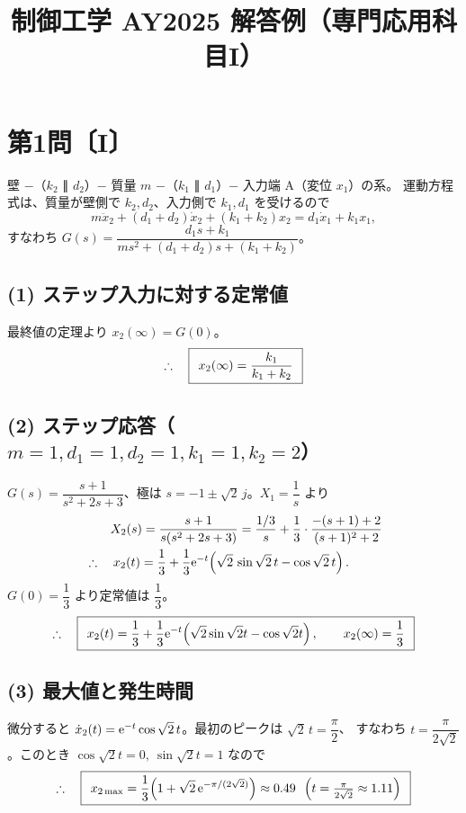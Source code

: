 \documentclass[11pt,a4paper]{article}
\title{制御工学 AY2025 解答例（専門応用科目I）}
\author{}
\date{}
\begin{document}
\maketitle

\section*{第1問〔I〕}

壁 $-$（$k_2$ ∥ $d_2$）$-$ 質量 $m$ $-$（$k_1$ ∥ $d_1$）$-$ 入力端 A（変位 $x_1$）の系。
運動方程式は、質量が壁側で $k_2,d_2$、入力側で $k_1,d_1$ を受けるので
\[
  m\ddot{x}_2+(d_1+d_2)\dot{x}_2+(k_1+k_2)x_2=d_1\dot{x}_1+k_1 x_1,
\]
すなわち $G(s)=\dfrac{d_1 s+k_1}{ms^2+(d_1+d_2)s+(k_1+k_2)}$。

\subsection*{(1) ステップ入力に対する定常値}
最終値の定理より $x_2(\infty)=G(0)$。
\[
  \therefore\quad \boxed{\,\;x_2(\infty)=\dfrac{k_1}{k_1+k_2}\;\,}
\]

\subsection*{(2) ステップ応答（$m=1,d_1=1,d_2=1,k_1=1,k_2=2$）}
$G(s)=\dfrac{s+1}{s^2+2s+3}$、極は $s=-1\pm\sqrt2\,j$。$X_1=\dfrac1s$ より
\begin{align*}
  &\qquad X_2(s)=\frac{s+1}{s(s^2+2s+3)}=\frac{1/3}{s}+\frac13\cdot\frac{-(s+1)+2}{(s+1)^2+2}\\
  &\therefore\quad x_2(t)=\frac13+\frac13\mathrm{e}^{-t}\!\left(\sqrt2\,\sin\sqrt2\,t-\cos\sqrt2\,t\right).
\end{align*}
$G(0)=\dfrac13$ より定常値は $\dfrac13$。
\[
  \therefore\quad \boxed{\,\;x_2(t)=\frac13+\frac13\mathrm{e}^{-t}\!\left(\sqrt2\sin\sqrt2 t-\cos\sqrt2 t\right),\qquad x_2(\infty)=\frac13\;\,}
\]

\subsection*{(3) 最大値と発生時間}
微分すると $\dot{x}_2(t)=\mathrm{e}^{-t}\cos\sqrt2\,t$。最初のピークは $\sqrt2\,t=\dfrac{\pi}{2}$、
すなわち $t=\dfrac{\pi}{2\sqrt2}$。このとき $\cos\sqrt2t=0,\ \sin\sqrt2t=1$ なので
\[
  \therefore\quad \ans{\;x_{2\max}=\frac13\Bigl(1+\sqrt2\,\e^{-\pi/(2\sqrt2)}\Bigr)\approx0.49\ \ \Bigl(t=\tfrac{\pi}{2\sqrt2}\approx1.11\Bigr)\;}
\]
\end{document}

